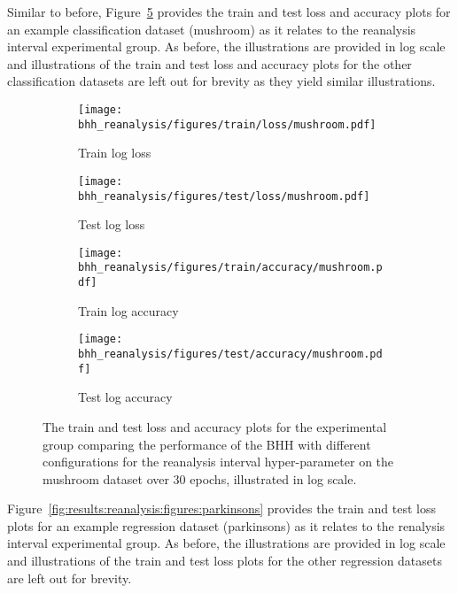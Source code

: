 Similar to before, Figure~\ref{fig:results:reanalysis:figures:mushroom} provides the train and test loss and accuracy plots for an example classification dataset (mushroom) as it relates to the reanalysis interval experimental group. As before, the illustrations are provided in log scale and illustrations of the train and test loss and accuracy plots for the other classification datasets are left out for brevity as they yield similar illustrations.

\begin{figure}[htbp]
      \begin{subfigure}{0.5\textwidth}
            \centering
            \texttt{[image: bhh\_reanalysis/figures/train/loss/mushroom.pdf]}
            \caption{Train log loss}
            \label{fig:results:reanalysis:figures:loss:train:mushroom}
      \end{subfigure}
      \begin{subfigure}{0.5\textwidth}
            \centering
            \texttt{[image: bhh\_reanalysis/figures/test/loss/mushroom.pdf]}
            \caption{Test log loss}
            \label{fig:results:reanalysis:figures:loss:test:mushroom}
      \end{subfigure}
      \par\bigskip
      \begin{subfigure}{0.5\textwidth}
            \centering
            \texttt{[image: bhh\_reanalysis/figures/train/accuracy/mushroom.pdf]}
            \caption{Train log accuracy}
            \label{fig:results:reanalysis:figures:accuracy:train:mushroom}
      \end{subfigure}
      \begin{subfigure}{0.5\textwidth}
            \centering
            \texttt{[image: bhh\_reanalysis/figures/test/accuracy/mushroom.pdf]}
            \caption{Test log accuracy}
            \label{fig:results:reanalysis:figures:accuracy:test:mushroom}
      \end{subfigure}
      \par\bigskip
      \caption{The train and test loss and accuracy plots for the experimental group comparing the performance of the \acs{BHH} with different configurations for the reanalysis interval hyper-parameter on the mushroom dataset over 30 epochs, illustrated in log scale.}
      \label{fig:results:reanalysis:figures:mushroom}
\end{figure}

Figure~\ref{fig:results:reanalysis:figures:parkinsons} provides the train and test loss plots for an example regression dataset (parkinsons) as it relates to the renalysis interval experimental group. As before, the illustrations are provided in log scale and illustrations of the train and test loss plots for the other regression datasets are left out for brevity.

